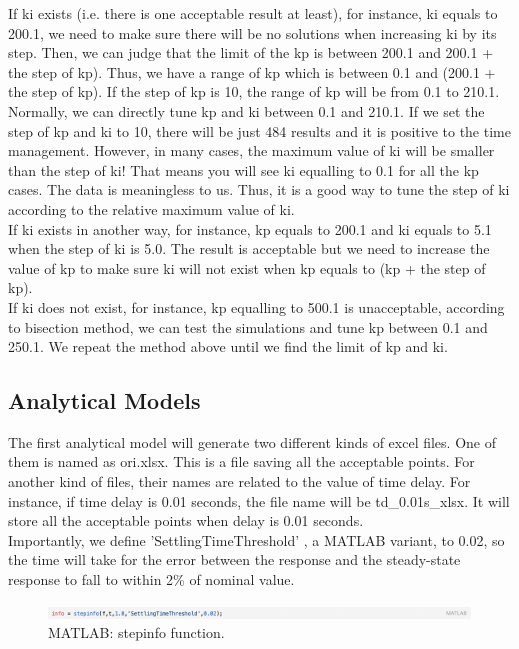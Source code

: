 \documentclass{report}
\begin{document}
If ki exists (i.e. there is one acceptable result at least), for instance, ki equals to 200.1, we need to make sure there will be no solutions when increasing ki by its step. Then, we can judge that the limit of the kp is between 200.1 and  200.1 + the step of kp). Thus, we have a range of kp which is between 0.1 and (200.1 + the step of kp). If the step of kp is 10, the range of kp will be from 0.1 to 210.1. Normally, we can directly tune kp and ki between 0.1 and 210.1. If we set the step of kp and ki to 10, there will be just 484 results and it is positive to the time management. However, in many cases, the maximum value of ki will be smaller than the step of ki! That means you will see ki equalling to 0.1 for all the kp cases. The data is meaningless to us. Thus, it is a good way to tune the step of ki according to the relative maximum value of ki.\\

If ki exists in another way, for instance, kp equals to 200.1 and ki equals to 5.1 when the step of ki is 5.0. The result is acceptable but we need to increase the value of kp to make sure ki will not exist when kp equals to (kp + the step of kp).\\

If ki does not exist, for instance, kp equalling to 500.1 is unacceptable, according to bisection method, we can test the simulations and tune kp between 0.1 and 250.1. We repeat the method above until we find the limit of kp and ki.\\


\subsection{Analytical Models} %
The first analytical model will generate two different kinds of excel files. One of them is named as ori.xlsx. This is a file saving all the acceptable points. For another kind of files, their names are related to the value of time delay. For instance, if time delay is 0.01 seconds, the file name will be td\_0.01s\_xlsx. It will store all the acceptable points when delay is 0.01 seconds.\\

Importantly, we define 'SettlingTimeThreshold' , a MATLAB variant, to 0.02, so the time will take for the error between the response and the steady-state response to fall to within 2\% of nominal value.\\

\begin{figure}[htbp]
\centering
\includegraphics[width = .999\textwidth]{figure/3_4_2_code4.png}
\caption{MATLAB: stepinfo function.}
\label{3_4_2_code4}
\end{figure}
\end{document}

